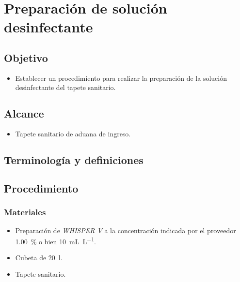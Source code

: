 \renewcommand{\MenorVer}{0}
\renewcommand{\MayorVer}{2}
\renewcommand{\Codigo}{HYS-9-IT}
\renewcommand{\FechaPub}{2023--01}
\renewcommand{\Titulo}{Preparación de solución desinfectante}

\section{\Titulo}

\subsection{Objetivo}
\begin{itemize}
	\item Establecer un procedimiento para realizar la preparación de la solución desinfectante del tapete sanitario.
\end{itemize}

\subsection{Alcance}
\begin{itemize}
	\item Tapete sanitario de aduana de ingreso.
\end{itemize}

\subsection{Terminología y definiciones}

\begin{description}
\end{description}

\subsection{Procedimiento}

\subsubsection{Materiales}
\begin{itemize}
	\item Preparación de \emph{WHISPER V} a la concentración indicada por el proveedor \qty{1.00}{\percent} o bien \qty{10}{\milli\liter\per\liter}.
	\item Cubeta de \qty{20}{\litre}.
	\item Tapete sanitario.
\end{itemize}

